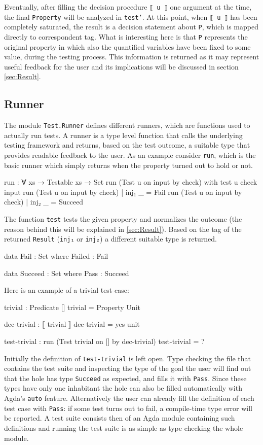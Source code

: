 \documentclass[10pt,a4paper]{article}
\begin{document}
Eventually, after filling the decision procedure \texttt{⟦ u ⟧} one argument at the time, the final \texttt{Property} will be analyzed in \texttt{test'}.
At this point, when \texttt{⟦ u ⟧} has been completely saturated, the result is a decision statement about \texttt{P}, which is mapped directly to correspondent tag.
What is interesting here is that \texttt{P} represents the original property in which also the quantified variables have been fixed to some value, during the testing process. 
This information is returned as it may represent useful feedback for the user and its implications will be discussed in section \ref{sec:Result}.

\subsection{Runner}
The module \texttt{Test.Runner} defines different runners, which are functions used to actually run tests.
A runner is a type level function that calls the underlying testing framework and returns, based on the test outcome, a suitable type that provides readable feedback to the user.
As an example consider \texttt{run}, which is the basic runner which simply returns when the property turned out to hold or not.
\begin{code}
run : ∀ {xs} → Testable xs → Set
run (Test u on input by check) with test u check input
run (Test u on input by check) | inj₁ _ = Fail
run (Test u on input by check) | inj₂ _ = Succeed
\end{code}
The function \texttt{test} tests the given property and normalizes the outcome (the reason behind this will be explained in \ref{sec:Result}).
Based on the tag of the returned \texttt{Result} (\texttt{inj₁} or \texttt{inj₂}) a different suitable type is returned.
\begin{code}
data Fail : Set where
  Failed : Fail

data Succeed : Set where
  Pass : Succeed
\end{code}
Here is an example of a trivial test-case:
\begin{code}
trivial : Predicate []
trivial = Property Unit

dec-trivial : ⟦ trivial ⟧
dec-trivial = yes unit

test-trivial : run (Test trivial on [] by dec-trivial)
test-trivial = ?
\end{code}
Initially the definition of \texttt{test-trivial} is left open.
Type checking the file that contains the test suite and inspecting the type of the goal the user will find out that the hole has type \texttt{Succeed} as expected, and fills it with \texttt{Pass}.
Since these types have only one inhabitant the hole can also be filled automatically with Agda's \texttt{auto} feature.
Alternatively the user can already fill the definition of each test case with \texttt{Pass}: if some test turns out to fail, a compile-time type error will be reported.
A test suite consists then of an Agda module containing such definitions and running the test suite is as simple as type checking the whole module.
\end{document}
